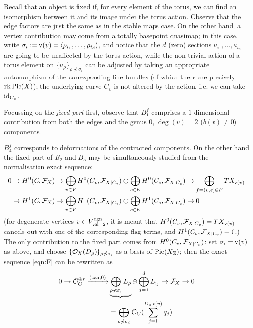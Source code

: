 Recall that an object is fixed if, for every element of the torus, we can find an isomorphism between it and its image under the torus action. Observe that the edge factors are just the same as in the stable maps case. On the other hand, a vertex contribution may come from a totally basepoint quasimap; in this case, write $\sigma_i:=\operatorname{v}(v)=\langle \rho_{i_1},\ldots,\rho_{i_d}\rangle$, and notice that the $d$ (zero) sections $u_{i_1},\ldots,u_{i_d}$ are going to be unaffected by the torus action, while the non-trivial action of a torus element on $\{u_\rho\}_{\rho\nprec\sigma_i}$ can be adjusted by taking an appropriate automorphism of the corresponding line bundles (of which there are precisely $\operatorname{rk}\operatorname{Pic}(X)$); the underlying curve $C_v$ is not altered by the action, i.e. we can take $\mathrm{id}_{C_v}$.

Focussing on the \emph{fixed part} first, observe that $B_1^f$ comprises a $1$-dimensional contribution from both the edges and the genus $0$, $\deg(v)=2$ ($b(v)\neq 0$) components. \begin{comment}, which cancels out with a corresponding term in $B_4^f$; this corresponds to the automorphism of a two-pointed rational curve. The remaining part of \end{comment} 
$B_4^f$ corresponds to deformations of the contracted components. On the other hand the fixed part of $B_2$ and $B_5$ may be simultaneously studied from the normalisation exact sequence:
\begin{equation*}%
\begin{aligned}
 0&\to H^0(C,\F_X)\to \bigoplus_{v\in V}H^0(C_v,\F_{X|C_v})\oplus \bigoplus_{e\in E}H^0(C_e,\F_{X|C_e})\to \bigoplus_{f=(v,e)\in F} TX_{\vv(v)} \\
 &\to H^1(C,\F_X)\to \bigoplus_{v\in V}H^1(C_v,\F_{X|C_v})\oplus \bigoplus_{e\in E}H^1(C_e,\F_{X|C_e})\to 0
\end{aligned} 
\end{equation*}
(for degenerate vertices $v\in V^\text{dgn}_{\operatorname{val}=2}$, it is meant that $H^0(C_v,\mathcal F_{X|C_v})=TX_{\operatorname{v}(v)}$ cancels out with one of the corresponding flag terms, and $H^1(C_v,\mathcal F_{X|C_v})=0$.) The only contribution to the fixed part comes from $H^0(C_v,\mathcal F_{X|C_v})$: set $\sigma_i=\operatorname{v}(v)$ as above, and choose $\{\mathcal{O}_X(D_\rho)\}_{\rho\nprec\sigma_i}$ as a basis of $\operatorname{Pic}(X_\Sigma)$; then the exact sequence \eqref{eqn:F} can be rewritten as
\begin{equation}\label{eqn:Fbasis}
 \begin{aligned}
 0\rightarrow\mathcal{O}_C^{\oplus r}\xrightarrow{\left(\text{can},0\right)} & \underbrace{\bigoplus_{\rho\nprec\sigma_i} L_\rho}\oplus\bigoplus_{j=1}^d L_{i_j}\rightarrow\mathcal F_X\rightarrow 0 \\
 & = \bigoplus_{\rho\nprec\sigma_i}\mathcal{O}_C(\sum_{j=1}^{D_\rho\cdot b(v)}q_j)
\end{aligned}
\end{equation}
